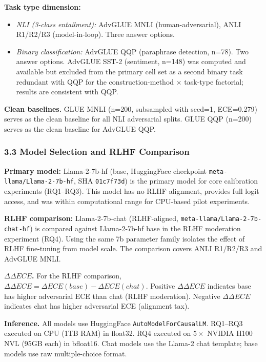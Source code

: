 \textbf{Task type dimension:}
\begin{itemize}
\item \textit{NLI (3-class entailment):} AdvGLUE MNLI (human-adversarial), ANLI R1/R2/R3 (model-in-loop). Three answer options.
\item \textit{Binary classification:} AdvGLUE QQP (paraphrase detection, n=78). Two answer options. AdvGLUE SST-2 (sentiment, n=148) was computed and available but excluded from the primary cell set as a second binary task redundant with QQP for the construction-method $\times$ task-type factorial; results are consistent with QQP.
\end{itemize}

\textbf{Clean baselines.} GLUE MNLI (n=200, subsampled with seed=1, ECE=0.279) serves as the clean baseline for all NLI adversarial splits. GLUE QQP (n=200) serves as the clean baseline for AdvGLUE QQP.

\subsubsection{3.3 Model Selection and RLHF Comparison}

\textbf{Primary model:} Llama-2-7b-hf (base, HuggingFace checkpoint \texttt{meta-llama/Llama-2-7b-hf}, SHA \texttt{01c7f73d}) is the primary model for core calibration experiments (RQ1--RQ3). This model has no RLHF alignment, provides full logit access, and was within computational range for CPU-based pilot experiments.

\textbf{RLHF comparison:} Llama-2-7b-chat (RLHF-aligned, \texttt{meta-llama/Llama-2-7b-chat-hf}) is compared against Llama-2-7b-hf base in the RLHF moderation experiment (RQ4). Using the same 7b parameter family isolates the effect of RLHF fine-tuning from model scale. The comparison covers ANLI R1/R2/R3 and AdvGLUE MNLI.

\textbf{$\Delta \Delta ECE$.} For the RLHF comparison, $\Delta \Delta ECE = \Delta ECE(base) - \Delta ECE(chat)$. Positive $\Delta \Delta ECE$ indicates base has higher adversarial ECE than chat (RLHF moderation). Negative $\Delta \Delta ECE$ indicates chat has higher adversarial ECE (alignment tax).

\textbf{Inference.} All models use HuggingFace \texttt{AutoModelForCausalLM}. RQ1--RQ3 executed on CPU (1TB RAM) in float32. RQ4 executed on $5\times$ NVIDIA H100 NVL (95GB each) in bfloat16. Chat models use the Llama-2 chat template; base models use raw multiple-choice format.

